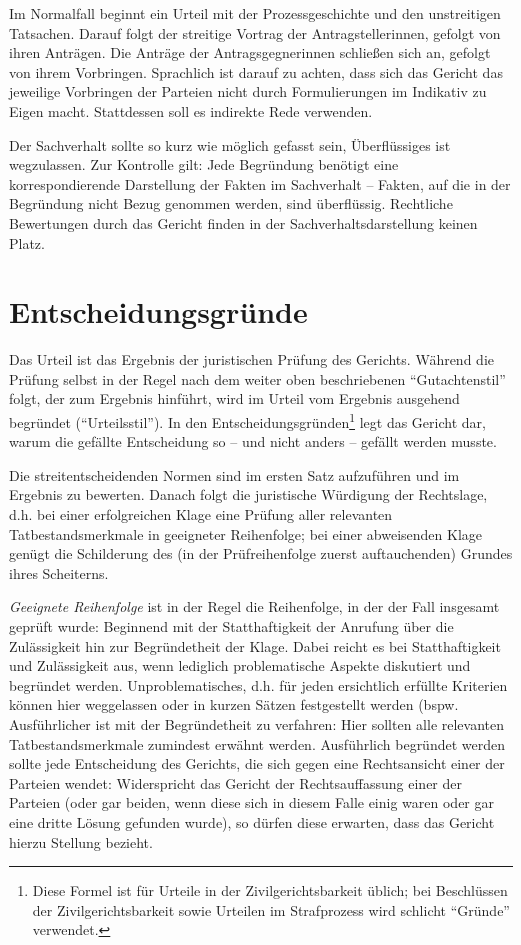 Im Normalfall beginnt ein Urteil mit der Prozessgeschichte und den unstreitigen Tatsachen. Darauf folgt der streitige Vortrag der Antragstellerinnen, gefolgt von ihren Anträgen. Die Anträge der Antragsgegnerinnen schließen sich an, gefolgt von ihrem Vorbringen. Sprachlich ist darauf zu achten, dass sich das Gericht das jeweilige Vorbringen der Parteien nicht durch Formulierungen im Indikativ zu Eigen macht. Stattdessen soll es indirekte Rede verwenden.

Der Sachverhalt sollte so kurz wie möglich gefasst sein, Überflüssiges ist wegzulassen. Zur Kontrolle gilt: Jede Begründung benötigt eine korrespondierende Darstellung der Fakten im Sachverhalt – Fakten, auf die in der Begründung nicht Bezug genommen werden, sind überflüssig. Rechtliche Bewertungen durch das Gericht finden in der Sachverhaltsdarstellung keinen Platz.

\section{Entscheidungsgründe}
Das Urteil ist das Ergebnis der juristischen Prüfung des Gerichts. Während die Prüfung selbst in der Regel nach dem weiter oben beschriebenen \enquote{Gutachtenstil} folgt, der zum Ergebnis hinführt, wird im Urteil vom Ergebnis ausgehend begründet (\enquote{Urteilsstil}). In den Entscheidungsgründen\footnote{Diese Formel ist für Urteile in der Zivilgerichtsbarkeit üblich; bei Beschlüssen der Zivilgerichtsbarkeit sowie Urteilen im Strafprozess wird schlicht \enquote{Gründe} verwendet.} legt das Gericht dar, warum die gefällte Entscheidung so – und nicht anders – gefällt werden musste.

Die streitentscheidenden Normen sind im ersten Satz aufzuführen und im Ergebnis zu bewerten.%
Danach folgt die juristische Würdigung der Rechtslage, d.h. bei einer erfolgreichen Klage eine Prüfung aller relevanten Tatbestandsmerkmale in geeigneter Reihenfolge; bei einer abweisenden Klage genügt die Schilderung des (in der Prüfreihenfolge zuerst auftauchenden) Grundes ihres Scheiterns.

\emph{Geeignete Reihenfolge} ist in der Regel die Reihenfolge, in der der Fall insgesamt geprüft wurde: Beginnend mit der Statthaftigkeit der Anrufung über die Zulässigkeit hin zur Begründetheit der Klage. Dabei reicht es bei Statthaftigkeit und Zulässigkeit aus, wenn lediglich problematische Aspekte diskutiert und begründet werden. Unproblematisches, d.h. für jeden ersichtlich erfüllte Kriterien können hier weggelassen oder in kurzen Sätzen festgestellt werden (bspw.  Ausführlicher ist mit der Begründetheit zu verfahren: Hier sollten alle relevanten Tatbestandsmerkmale zumindest erwähnt werden. Ausführlich begründet werden sollte jede Entscheidung des Gerichts, die sich gegen eine Rechtsansicht einer der Parteien wendet: Widerspricht das Gericht der Rechtsauffassung einer der Parteien (oder gar beiden, wenn diese sich in diesem Falle einig waren oder gar eine dritte Lösung gefunden wurde), so dürfen diese erwarten, dass das Gericht hierzu Stellung bezieht.

